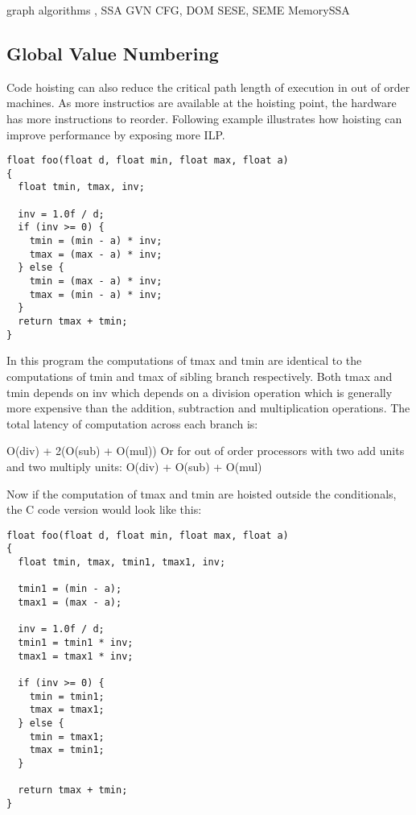 \documentclass{sig-alternate}
\begin{document}
graph algorithms \cite{tarjan},
SSA \cite{cytron}
GVN \cite{rosen1988global,click1995global}
CFG, DOM \cite{dragonbook}
SESE, SEME \cite{sese}
MemorySSA \cite{novillo2007memory}

\subsection{Global Value Numbering}

Code hoisting can also reduce the critical path length of execution in out of
order machines. As more instructios are available at the hoisting point, the
hardware has more instructions to reorder. Following example illustrates how
hoisting can improve performance by exposing more ILP.

\begin{verbatim}
float foo(float d, float min, float max, float a)
{
  float tmin, tmax, inv;

  inv = 1.0f / d;
  if (inv >= 0) {
    tmin = (min - a) * inv;
    tmax = (max - a) * inv;
  } else {
    tmin = (max - a) * inv;
    tmax = (min - a) * inv;
  }
  return tmax + tmin;
}
\end{verbatim}

In this program the computations of tmax and tmin are identical to the
computations of tmin and tmax of sibling branch respectively. Both tmax and tmin
depends on inv which depends on a division operation which is generally more
expensive than the addition, subtraction and multiplication operations. The
total latency of computation across each branch is:

O(div) + 2(O(sub) + O(mul))
Or for out of order processors with two add units and two multiply units:
O(div) + O(sub) + O(mul)

Now if the computation of tmax and tmin are hoisted outside the
conditionals, the C code version would look like this:
\begin{verbatim}
float foo(float d, float min, float max, float a)
{
  float tmin, tmax, tmin1, tmax1, inv;

  tmin1 = (min - a);
  tmax1 = (max - a);

  inv = 1.0f / d;
  tmin1 = tmin1 * inv;
  tmax1 = tmax1 * inv;

  if (inv >= 0) {
    tmin = tmin1;
    tmax = tmax1;
  } else {
    tmin = tmax1;
    tmax = tmin1;
  }

  return tmax + tmin;
}

\end{verbatim}
\end{document}
